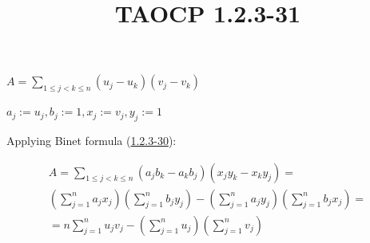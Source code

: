 \documentclass{article}
\title{TAOCP 1.2.3\mbox{-}31}
\begin{document}
\maketitle

\( A = \sum_{1 \leq j < k \leq n} (u_{j}-u_{k})(v_{j}-v_{k}) \)

\( a_{j} := u_{j}, b_{j} := 1, x_{j} := v_{j}, y_{j} := 1 \)

Applying Binet formula (\href{./1.2.3-30.pdf}{1.2.3\mbox{-}30}):

\begin{multline*}
A = \sum_{1\leq j < k \leq n} (a_{j}b_{k}-a_{k}b_{j})(x_{j}y_{k}-x_{k}y_{j}) = \\
(\sum_{j=1}^{n} a_{j}x_{j})(\sum_{j=1}^{n} b_{j}y_{j}) - (\sum_{j=1}^{n} a_{j}y_{j})(\sum_{j=1}^{n} b_{j}x_{j}) = \\
= n \sum_{j=1}^{n} u_{j}v_{j} - (\sum_{j=1}^{n} u_{j})(\sum_{j=1}^{n} v_{j})
\end{multline*}
\end{document}
